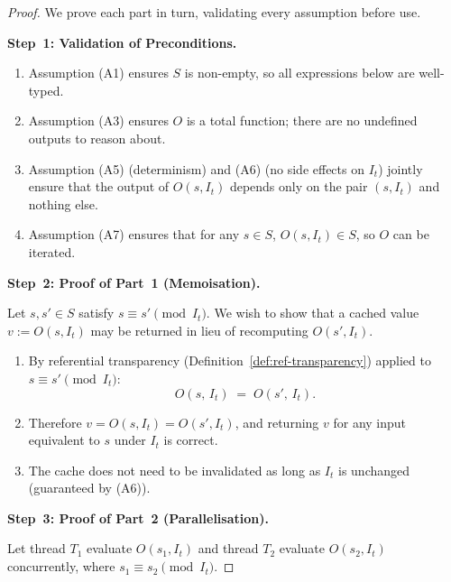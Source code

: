 \documentclass[12pt,openany]{book}
\newcommand{\calI}{\mathcal{I}}
\numberwithin{equation}{chapter}
\theoremstyle{plain}
\theoremstyle{definition}
\theoremstyle{remark}
\numberwithin{equation}{chapter}
\theoremstyle{plain}
\newcommand{\calS}{\mathcal{S}}
\def\calI{I}%
\def\calS{S}%
\begin{document}
\begin{proof}
We prove each part in turn, validating every assumption before use.

\medskip
\noindent\textbf{Step~1: Validation of Preconditions.}
\begin{enumerate}
  \item Assumption (A1) ensures $\calS$ is non-empty, so all
        expressions below are well-typed.
  \item Assumption (A3) ensures $O$ is a total function; there are no
        undefined outputs to reason about.
  \item Assumption (A5) (determinism) and (A6) (no side effects on
        $\calI_t$) jointly ensure that the output of $O(s, \calI_t)$
        depends only on the pair $(s, \calI_t)$ and nothing else.
  \item Assumption (A7) ensures that for any $s \in \calS$,
        $O(s, \calI_t) \in \calS$, so $O$ can be iterated.
\end{enumerate}

\medskip
\noindent\textbf{Step~2: Proof of Part~1 (Memoisation).}

Let $s, s' \in \calS$ satisfy $s \equiv s' \pmod{\calI_t}$.  We wish
to show that a cached value $v := O(s, \calI_t)$ may be returned in
lieu of recomputing $O(s', \calI_t)$.

\begin{enumerate}
  \item By referential transparency (Definition~\ref{def:ref-transparency})
        applied to $s \equiv s' \pmod{\calI_t}$:
        \begin{equation}
          O(s,\, \calI_t) \;=\; O(s',\, \calI_t).
          \label{eq:memo-rt}
        \end{equation}
  \item Therefore $v = O(s, \calI_t) = O(s', \calI_t)$, and returning
        $v$ for any input equivalent to $s$ under $\calI_t$ is correct.
  \item The cache does not need to be invalidated as long as $\calI_t$
        is unchanged (guaranteed by (A6)).
\end{enumerate}

\medskip
\noindent\textbf{Step~3: Proof of Part~2 (Parallelisation).}

Let thread $T_1$ evaluate $O(s_1, \calI_t)$ and thread $T_2$ evaluate
$O(s_2, \calI_t)$ concurrently, where $s_1 \equiv s_2
\pmod{\calI_t}$.


\end{proof}
\end{document}
